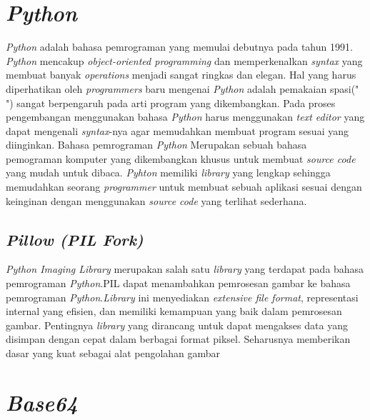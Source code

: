 \section{\textit{Python}}
\label{sec:python}
\textit{Python} adalah bahasa pemrograman yang memulai debutnya pada tahun 1991. \textit{Python} mencakup \textit{object-oriented programming} dan memperkenalkan \textit{syntax} yang membuat banyak \textit{operations} menjadi sangat ringkas dan elegan. Hal yang harus diperhatikan oleh \textit{programmers} baru mengenai \textit{Python} adalah pemakaian spasi(" ") sangat berpengaruh pada arti program yang dikembangkan. Pada proses pengembangan menggunakan bahasa \textit{Python} harus menggunakan \textit{text editor} yang dapat mengenali \textit{syntax}-nya agar memudahkan membuat program sesuai yang diinginkan.
Bahasa pemrograman \textit{Python} Merupakan sebuah bahasa pemograman komputer yang dikembangkan khusus untuk membuat \textit{source code} yang mudah untuk dibaca. \textit{Pyhton} memiliki \textit{library} yang lengkap sehingga memudahkan seorang \textit{programmer} untuk membuat sebuah aplikasi sesuai dengan keinginan dengan menggunakan \textit{source code} yang terlihat sederhana.

\subsection{\textit{Pillow (PIL Fork)}}
\label{subsec:python PIL}
\textit{Python Imaging Library} merupakan salah satu \textit{library} yang terdapat pada bahasa pemrograman \textit{Python}.PIL dapat menambahkan pemrosesan gambar ke bahasa pemrograman \textit{Python}.\textit{Library} ini menyediakan \textit{extensive file format}, representasi internal yang efisien, dan memiliki kemampuan yang baik dalam pemrosesan gambar. Pentingnya \textit{library} yang dirancang untuk dapat mengakses data yang disimpan dengan cepat dalam berbagai format piksel. Seharusnya memberikan dasar yang kuat sebagai alat pengolahan gambar

\section{\textit{Base64}}
\label{sec:base64}

